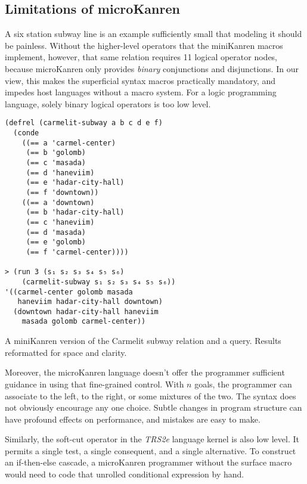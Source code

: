 \documentclass[sigplan,balance=true,pbalance=true,natbib=false]{acmart}
\begin{document}
\subsection{Limitations of microKanren}

A six station subway line is an example sufficiently small that
modeling it should be painless. Without the higher-level operators
that the miniKanren macros implement, however, that same relation
requires 11 logical operator nodes, because microKanren only provides
\emph{binary} conjunctions and disjunctions. In our view, this makes
the superficial syntax macros practically mandatory, and impedes host
languages without a macro system. For a logic programming language,
solely binary logical operators is too low level.

\begin{listing}
  \begin{verbatim}
(defrel (carmelit-subway a b c d e f)
  (conde
    ((== a 'carmel-center)
     (== b 'golomb)
     (== c 'masada)
     (== d 'haneviim)
     (== e 'hadar-city-hall)
     (== f 'downtown))
    ((== a 'downtown)
     (== b 'hadar-city-hall)
     (== c 'haneviim)
     (== d 'masada)
     (== e 'golomb)
     (== f 'carmel-center))))

> (run 3 (s₁ s₂ s₃ s₄ s₅ s₆)
    (carmelit-subway s₁ s₂ s₃ s₄ s₅ s₆))
'((carmel-center golomb masada
   haneviim hadar-city-hall downtown)
  (downtown hadar-city-hall haneviim
    masada golomb carmel-center))
  \end{verbatim}
  \caption{A miniKanren version of the Carmelit subway relation and a query. Results reformatted for space and clarity.}
  \label{mnt:carmelit}
\end{listing}

Moreover, the microKanren language doesn't offer the programmer
sufficient guidance in using that fine-grained control. With $n$
goals, the programmer can associate to the left, to the right, or some
mixtures of the two. The syntax does not obviously encourage any one
choice. Subtle changes in program structure can have profound effects
on performance, and mistakes are easy to make.

Similarly, the soft-cut operator  in the \emph{TRS2e}
language kernel is also low level. It permits a single test, a single
consequent, and a single alternative. To construct an if-then-else
cascade, a microKanren programmer without the 
surface macro would need to code that unrolled conditional expression
by hand.
\end{document}
